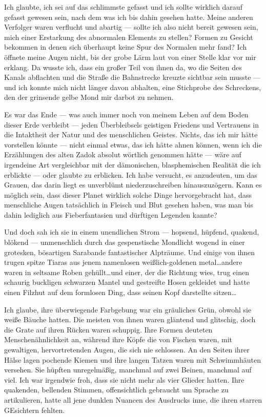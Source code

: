 Ich glaubte, ich sei auf das schlimmste gefasst und ich sollte wirklich darauf gefasst gewesen sein, nach dem was ich bis dahin gesehen hatte. Meine anderen Verfolger waren verflucht und abartig --- sollte ich also nicht bereit gewesen sein, mich einer Erstarkung des abnormalen Elements zu stellen? Formen zu Gesicht bekommen in denen sich überhaupt keine Spur des Normalen mehr fand? Ich öffnete meine Augen nicht, bis der grobe Lärm laut von einer Stelle klar vor mir erklang. Da wusste ich, dass ein großer Teil von ihnen da, wo die Seiten des Kanals abflachten und die Straße die Bahnstrecke kreuzte sichtbar sein musste --- und ich konnte mich nicht länger davon abhalten, eine Stichprobe des Schreckens, den der grinsende gelbe Mond mir darbot zu nehmen.

Es war das Ende --- was auch immer noch von meinem Leben auf dem Boden dieser Erde verbleibt --- jeden Überbleibsels geistigen Friedens und Vertrauens in die Intaktheit der Natur und des menschlichen Geistes. Nichts, das ich mir hätte vorstellen könnte --- nicht einmal etwas, das ich hätte ahnen können, wenn ich die Erzählungen des alten Zadok absolut wörtlich genommen hätte --- wäre auf irgendeine Art vergleichbar mit der dämonischen, blasphemischen Realität die ich erblickte --- oder glaubte zu erblicken. Ich habe versucht, es anzudeuten, um das Grauen, das darin liegt es unverblümt niederzuschreiben hinauszuzögern. Kann es möglich sein, dass dieser Planet wirklich solche Dinge hervorgebracht hat, dass menschliche Augen tatsächlich in Fleisch und Blut gesehen haben, was man bis dahin lediglich aus Fieberfantasien und dürftigen Legenden kannte?

Und doch sah ich sie in einem unendlichen Strom --- hopsend, hüpfend, quakend, blökend --- unmenschlich durch das gespenstische Mondlicht wogend in einer grotesken, bösartigen Sarabande fantastischer Alpträume. Und einige von ihnen trugen spitze Tiaras aus jenem namenlosen weißlich-goldenen metal\dots  andere waren in seltsame Roben gehüllt\dots  und einer, der die Richtung wies, trug einen schaurig buckligen schwarzen Mantel und gestreifte Hosen gekleidet und hatte einen Filzhut auf dem formlosen Ding, dass seinen Kopf darstellte sitzen\dots

Ich glaube, ihre überwiegende Farbgebung war ein gräuliches Grün, obwohl sie weiße Bäuche hatten. Die meisten von ihnen waren gläntend und glitschig, doch die Grate auf ihren Rücken waren schuppig. Ihre Formen deuteten Menschenähnlichkeit an, während ihre Köpfe die von Fischen waren, mit gewaltigen, hervortretenden Augen, die sich nie schlossen. An den Seiten ihrer Hälse lagen pochende Kiemen und ihre langen Tatzen waren mit Schwimmhäuten versehen. Sie hüpften unregelmäßig, manchmal auf zwei Beinen, manchmal auf viel. Ich war irgendwie froh, dass sie nicht mehr als vier Glieder hatten. Ihre quakenden, bellenden Stimmen, offensichtlich gebraucht um Sprache zu artikulieren, hatte all jene dunklen Nuancen des Ausdrucks inne, die ihren starren GEsichtern fehlten.

